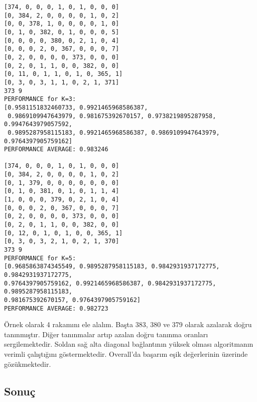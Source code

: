 \documentclass[11pt]{article}
\begin{document}
\begin{enumerate}[\indent a)]
\begin{verbatim}
[374, 0, 0, 0, 1, 0, 1, 0, 0, 0]
[0, 384, 2, 0, 0, 0, 0, 1, 0, 2]
[0, 0, 378, 1, 0, 0, 0, 0, 1, 0]
[0, 1, 0, 382, 0, 1, 0, 0, 0, 5]
[0, 0, 0, 0, 380, 0, 2, 1, 0, 4]
[0, 0, 0, 2, 0, 367, 0, 0, 0, 7]
[0, 2, 0, 0, 0, 0, 373, 0, 0, 0]
[0, 2, 0, 1, 1, 0, 0, 382, 0, 0]
[0, 11, 0, 1, 1, 0, 1, 0, 365, 1]
[0, 3, 0, 3, 1, 1, 0, 2, 1, 371]
373 9
PERFORMANCE for K=3: 
[0.9581151832460733, 0.9921465968586387,
 0.9869109947643979, 0.981675392670157, 0.9738219895287958, 0.9947643979057592, 
 0.9895287958115183, 0.9921465968586387, 0.9869109947643979, 0.9764397905759162]
PERFORMANCE AVERAGE: 0.983246

[374, 0, 0, 0, 1, 0, 1, 0, 0, 0]
[0, 384, 2, 0, 0, 0, 0, 1, 0, 2]
[0, 1, 379, 0, 0, 0, 0, 0, 0, 0]
[0, 1, 0, 381, 0, 1, 0, 1, 1, 4]
[1, 0, 0, 0, 379, 0, 2, 1, 0, 4]
[0, 0, 0, 2, 0, 367, 0, 0, 0, 7]
[0, 2, 0, 0, 0, 0, 373, 0, 0, 0]
[0, 2, 0, 1, 1, 0, 0, 382, 0, 0]
[0, 12, 0, 1, 0, 1, 0, 0, 365, 1]
[0, 3, 0, 3, 2, 1, 0, 2, 1, 370]
373 9
PERFORMANCE for K=5: 
[0.9685863874345549, 0.9895287958115183, 0.9842931937172775, 0.9842931937172775, 
0.9764397905759162, 0.9921465968586387, 0.9842931937172775, 0.9895287958115183, 
0.981675392670157, 0.9764397905759162]
PERFORMANCE AVERAGE: 0.982723

\end{verbatim}

Örnek olarak 4 rakamını ele alalım. Başta 383, 380 ve 379 olarak azalarak doğru tanınmıştır. Diğer tanınmalar artıp azalan doğru tanınma oranları sergilemektedir. Soldan sağ alta diagonal bağlantının yüksek olması algoritmanın verimli çalıştığını göstermektedir. Overall'da başarım eşik değerlerinin üzerinde gözükmektedir.

\end{enumerate}
\subsection*{Sonuç}
\end{document}
